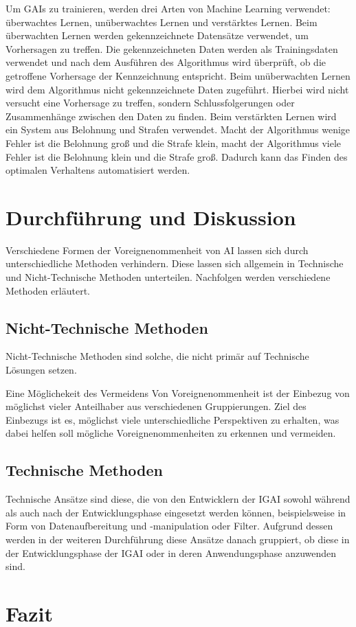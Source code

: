 \documentclass[12pt]{article}
\begin{document}
Um GAIs zu trainieren, werden drei Arten von Machine Learning verwendet: überwachtes Lernen, unüberwachtes Lernen und verstärktes Lernen. 
Beim überwachten Lernen werden gekennzeichnete Datensätze verwendet, um Vorhersagen zu treffen. Die gekennzeichneten Daten werden als Trainingsdaten verwendet und nach dem Ausführen des Algorithmus wird überprüft, ob die getroffene Vorhersage der Kennzeichnung entspricht.
Beim unüberwachten Lernen wird dem Algorithmus nicht gekennzeichnete Daten zugeführt. Hierbei wird nicht versucht eine Vorhersage zu treffen, sondern Schlussfolgerungen oder Zusammenhänge zwischen den Daten zu finden.
Beim verstärkten Lernen wird ein System aus Belohnung und Strafen verwendet. Macht der Algorithmus wenige Fehler ist die Belohnung groß und die Strafe klein, macht der Algorithmus viele Fehler ist die Belohnung klein und die Strafe groß. Dadurch kann das Finden des optimalen Verhaltens automatisiert werden.

\section{Durchführung und Diskussion}
Verschiedene Formen der Voreignenommenheit von AI lassen sich durch unterschiedliche Methoden verhindern. Diese lassen sich allgemein in 
Technische und Nicht-Technische Methoden unterteilen. Nachfolgen werden verschiedene Methoden erläutert.
\subsection*{Nicht-Technische Methoden}
Nicht-Technische Methoden sind solche, die nicht primär auf Technische Lösungen setzen.

Eine Möglichekeit des Vermeidens Von Voreignenommenheit ist der Einbezug von möglichst vieler Anteilhaber aus verschiedenen Gruppierungen. 
Ziel des Einbezugs ist es, möglichst viele unterschiedliche Perspektiven zu erhalten, was dabei helfen soll mögliche Voreignenommenheiten zu erkennen und vermeiden.

\subsection*{Technische Methoden}
Technische Ansätze sind diese, die von den Entwicklern der IGAI sowohl während als auch nach der Entwicklungsphase eingesetzt werden können, beispielsweise in Form von Datenaufbereitung und -manipulation oder Filter. 
Aufgrund dessen werden in der weiteren Durchführung diese Ansätze danach gruppiert, ob diese in der Entwicklungsphase der IGAI oder in deren Anwendungsphase anzuwenden sind.
\section{Fazit}


\end{document}
